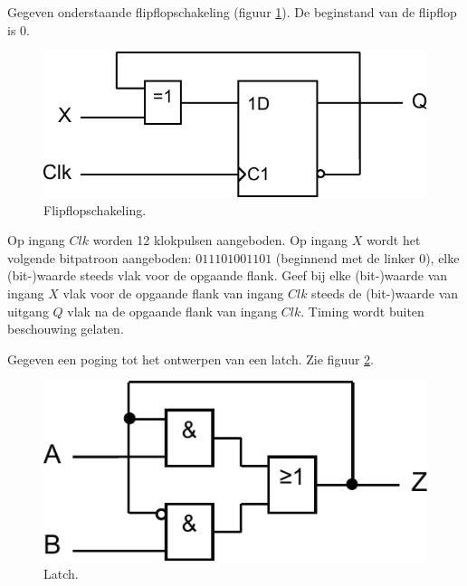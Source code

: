 \documentclass[a4paper,12pt,addpoints,fleqn,dutch,concept]{tisdexam}
\begin{document}
\begin{questions}
\newpage

\question[10]
\label{opg:opg6}
Gegeven onderstaande flipflopschakeling (figuur \ref{fig:opg6}). De beginstand van de
flipflop is 0.

\begin{figure}[H]
  \centering
  \includegraphics[scale=0.63]{pINLDIG2014_opgave6_schema.pdf}
  \caption{Flipflopschakeling.}
  \label{fig:opg6}
\end{figure}

Op ingang $Clk$ worden 12 klokpulsen aangeboden. Op ingang $X$ wordt het
volgende bitpatroon aangeboden: $011101001101$ (beginnend met de linker $0$),
elke (bit-)waarde steeds vlak
voor de opgaande flank. Geef bij elke (bit-)waarde van ingang $X$ vlak voor de
opgaande flank van ingang $Clk$ steeds de (bit-)waarde van uitgang $Q$ vlak na
de opgaande flank van ingang $Clk$. Timing wordt buiten beschouwing gelaten.



\question
\label{opg:opg7}
Gegeven een poging tot het ontwerpen van een latch. Zie figuur \ref{fig:opg7}.

\begin{figure}[H]
  \centering
  \includegraphics[scale=0.63]{pINLDIG2014_opgave7_schema.pdf}
  \caption{Latch.}
  \label{fig:opg7}
\end{figure}

\end{questions}
\end{document}
